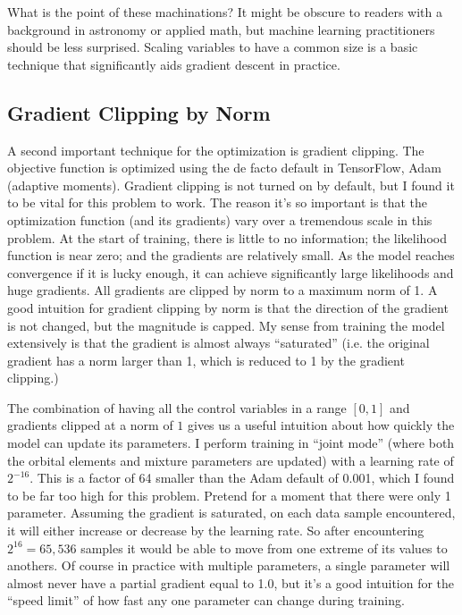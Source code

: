 What is the point of these machinations?
It might be obscure to readers with a background in astronomy or applied math, but machine learning practitioners should be less surprised.
Scaling variables to have a common size is a basic technique that significantly aids gradient descent in practice.

\subsection{Gradient Clipping by Norm}
A second important technique for the optimization is gradient clipping.
The objective function is optimized using the de facto default in TensorFlow, Adam (adaptive moments).
Gradient clipping is not turned on by default, but I found it to be vital for this problem to work.
The reason it's so important is that the optimization function (and its gradients) vary over a tremendous scale in this problem.
At the start of training, there is little to no information; the likelihood function is near zero; and the gradients are relatively small.
As the model reaches convergence if it is lucky enough, it can achieve significantly large likelihoods and huge gradients.
All gradients are clipped by norm to a maximum norm of 1.
A good intuition for gradient clipping by norm is that the direction of the gradient is not changed, but the magnitude is capped.
My sense from training the model extensively is that the gradient is almost always ``saturated'' 
(i.e. the original gradient has a norm larger than 1, which is reduced to 1 by the gradient clipping.)

The combination of having all the control variables in a range $[0, 1]$ and gradients clipped at a norm of $1$
gives us a useful intuition about how quickly the model can update its parameters.
I perform training in ``joint mode'' (where both the orbital elements and mixture parameters are updated) with a learning rate of $2^{-16}$.  
This is a factor of 64 smaller than the Adam default of 0.001, which I found to be far too high for this problem.
Pretend for a moment that there were only 1 parameter.  
Assuming the gradient is saturated, on each data sample encountered, it will either increase or decrease by the learning rate.
So after encountering $2^{16} = 65,536$ samples it would be able to move from one extreme of its values to anothers.
Of course in practice with multiple parameters, a single parameter will almost never have a partial gradient equal to 1.0,
but it's a good intuition for the ``speed limit'' of how fast any one parameter can change during training.

